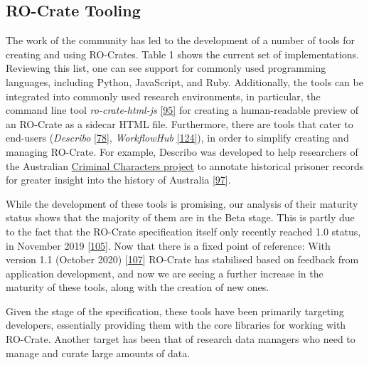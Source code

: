 \hypertarget{tooling}{%
\subsection{RO-Crate Tooling}\label{tooling}}

The work of the community has led to the development of a number of
tools for creating and using RO-Crates. Table 1 shows the current set of
implementations. Reviewing this list, one can see support for commonly
used programming languages, including Python, JavaScript, and Ruby.
Additionally, the tools can be integrated into commonly used research
environments, in particular, the command line tool
\emph{ro-crate-html-js}
\href{https://www.npmjs.com/package/ro-crate-html-js}{{[}95{]}} for
creating a human-readable preview of an RO-Crate as a sidecar HTML file.
Furthermore, there are tools that cater to end-users (\emph{Describo}
\href{https://arkisto-platform.github.io/describo/}{{[}78{]}},
\emph{WorkflowHub} \href{https://w3id.org/workflowhub/}{{[}124{]}}), in
order to simplify creating and managing RO-Crate. For example, Describo
was developed to help researchers of the Australian
\href{https://criminalcharacters.com/}{Criminal Characters project} to
annotate historical prisoner records for greater insight into the
history of Australia
{[}\href{https://doi.org/10.1080/14490854.2020.1796500}{97}{]}.

While the development of these tools is promising, our analysis of their
maturity status shows that the majority of them are in the Beta stage.
This is partly due to the fact that the RO-Crate specification itself
only recently reached 1.0 status, in November 2019
{[}\href{https://doi.org/10.5281/zenodo.3541888}{105}{]}. Now that there
is a fixed point of reference: With version 1.1 (October 2020)
{[}\href{https://doi.org/10.5281/zenodo.4031327}{107}{]} RO-Crate has
stabilised based on feedback from application development, and now we
are seeing a further increase in the maturity of these tools, along with
the creation of new ones.

Given the stage of the specification, these tools have been primarily
targeting developers, essentially providing them with the core libraries
for working with RO-Crate. Another target has been that of research data
managers who need to manage and curate large amounts of data.

